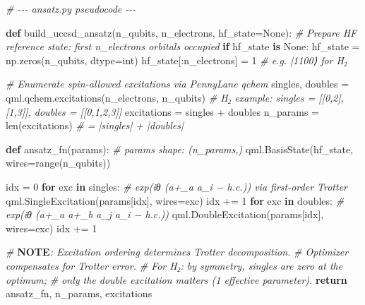 \documentclass[
  11pt,
]{report}
\newenvironment{Shaded}{}{}
\newcommand{\AlertTok}[1]{\textcolor[rgb]{1.00,0.00,0.00}{\textbf{#1}}}
\newcommand{\BuiltInTok}[1]{\textcolor[rgb]{0.00,0.50,0.00}{#1}}
\newcommand{\CommentTok}[1]{\textcolor[rgb]{0.38,0.63,0.69}{\textit{#1}}}
\newcommand{\ControlFlowTok}[1]{\textcolor[rgb]{0.00,0.44,0.13}{\textbf{#1}}}
\newcommand{\DecValTok}[1]{\textcolor[rgb]{0.25,0.63,0.44}{#1}}
\newcommand{\KeywordTok}[1]{\textcolor[rgb]{0.00,0.44,0.13}{\textbf{#1}}}
\newcommand{\NormalTok}[1]{#1}
\newcommand{\OperatorTok}[1]{\textcolor[rgb]{0.40,0.40,0.40}{#1}}
\newcommand{\VariableTok}[1]{\textcolor[rgb]{0.10,0.09,0.49}{#1}}
\begin{document}
\begin{Shaded}
\begin{Highlighting}[]
\CommentTok{\# {-}{-}{-} ansatz.py pseudocode {-}{-}{-}}

\KeywordTok{def}\NormalTok{ build\_uccsd\_ansatz(n\_qubits, n\_electrons, hf\_state}\OperatorTok{=}\VariableTok{None}\NormalTok{):}
    \CommentTok{\# Prepare HF reference state: first n\_electrons orbitals occupied}
    \ControlFlowTok{if}\NormalTok{ hf\_state }\KeywordTok{is} \VariableTok{None}\NormalTok{:}
\NormalTok{        hf\_state }\OperatorTok{=}\NormalTok{ np.zeros(n\_qubits, dtype}\OperatorTok{=}\BuiltInTok{int}\NormalTok{)}
\NormalTok{        hf\_state[:n\_electrons] }\OperatorTok{=} \DecValTok{1}   \CommentTok{\# e.g. |1100⟩ for H₂}

    \CommentTok{\# Enumerate spin{-}allowed excitations via PennyLane qchem}
\NormalTok{    singles, doubles }\OperatorTok{=}\NormalTok{ qml.qchem.excitations(n\_electrons, n\_qubits)}
    \CommentTok{\# H₂ example: singles = [[0,2], [1,3]], doubles = [[0,1,2,3]]}
\NormalTok{    excitations }\OperatorTok{=}\NormalTok{ singles }\OperatorTok{+}\NormalTok{ doubles}
\NormalTok{    n\_params }\OperatorTok{=} \BuiltInTok{len}\NormalTok{(excitations)             }\CommentTok{\# = |singles| + |doubles|}

    \KeywordTok{def}\NormalTok{ ansatz\_fn(params):                  }\CommentTok{\# params shape: (n\_params,)}
\NormalTok{        qml.BasisState(hf\_state, wires}\OperatorTok{=}\BuiltInTok{range}\NormalTok{(n\_qubits))}

\NormalTok{        idx }\OperatorTok{=} \DecValTok{0}
        \ControlFlowTok{for}\NormalTok{ exc }\KeywordTok{in}\NormalTok{ singles:}
            \CommentTok{\# exp(iθ (a+\_a a\_i − h.c.)) via first{-}order Trotter}
\NormalTok{            qml.SingleExcitation(params[idx], wires}\OperatorTok{=}\NormalTok{exc)}
\NormalTok{            idx }\OperatorTok{+=} \DecValTok{1}
        \ControlFlowTok{for}\NormalTok{ exc }\KeywordTok{in}\NormalTok{ doubles:}
            \CommentTok{\# exp(iθ (a+\_a a+\_b a\_j a\_i − h.c.))}
\NormalTok{            qml.DoubleExcitation(params[idx], wires}\OperatorTok{=}\NormalTok{exc)}
\NormalTok{            idx }\OperatorTok{+=} \DecValTok{1}

    \CommentTok{\# }\AlertTok{NOTE}\CommentTok{: Excitation ordering determines Trotter decomposition.}
    \CommentTok{\# Optimizer compensates for Trotter error.}
    \CommentTok{\# For H₂: by symmetry, singles are zero at the optimum;}
    \CommentTok{\# only the double excitation matters (1 effective parameter).}
    \ControlFlowTok{return}\NormalTok{ ansatz\_fn, n\_params, excitations}



\end{Highlighting}
\end{Shaded}
\end{document}
